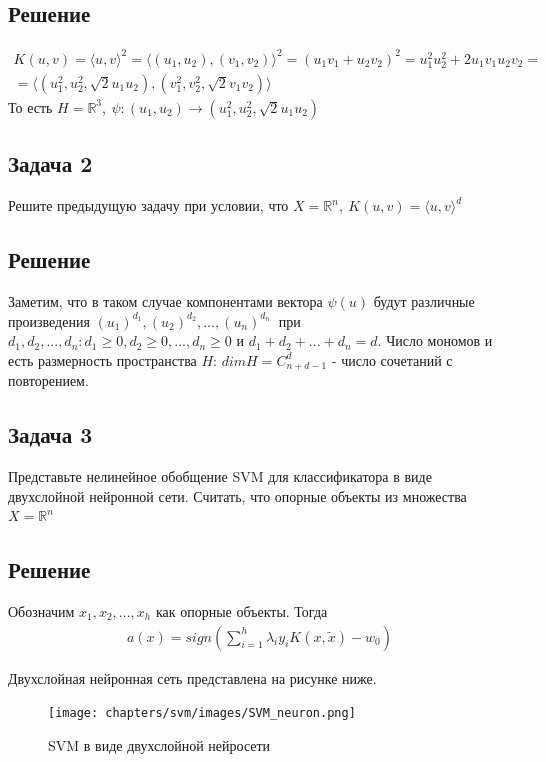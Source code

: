 \subsection{Решение}
\begin{align*}
  K(u, v) = \langle u, v \rangle^2 = \langle (u_1, u_2), (v_1, v_2) \rangle^2 = (u_1v_1 + u_2v_2)^2 = u_1^2 u_2^2 + 2u_1v_1u_2v_2 = \\
  = \langle(u_1^2, u_2^2, \sqrt{2}u_1u_2),(v_1^2, v_2^2, \sqrt{2}v_1v_2)\rangle 
\end{align*}
То есть $ H = \mathbb{R}^3, ~ \psi: (u_1, u_2) \rightarrow (u_1^2, u_2^2, \sqrt{2}u_1u_2)$

\subsection{Задача 2}
Решите предыдущую задачу при условии, что $X = \mathbb{R}^n, ~ K(u, v) = \langle u, v \rangle^{d}$
\subsection{Решение}
Заметим, что в таком случае компонентами вектора $\psi(u)$ будут различные произведения $(u_1)^{d_1}, (u_2)^{d_2}, ..., (u_n)^{d_n}~$ при
$d_1, d_2, ..., d_n: d_1 \ge 0, d_2 \ge 0, ..., d_n \ge 0$ и $ d_1 + d_2 + ... + d_n = d$. Число мономов и есть размерность пространства $H$: $dim H = C_{n + d - 1} ^ d$ - число сочетаний с повторением.

\subsection{Задача 3}
Представьте нелинейное обобщение SVM для классификатора в виде двухслойной нейронной сети. Считать,
что опорные объекты из множества $ X = \mathbb{R}^n~$
\subsection{Решение}
Обозначим $x_1, x_2, ..., x_h$ как опорные объекты. Тогда
\begin{align}
  a(x) = sign(\sum_{i = 1}^{h} \lambda_i y_i K(x, \tilde{x}) - w_0)
\end{align}

\noindent Двухслойная нейронная сеть представлена на рисунке ниже.

\begin{figure}[h!]
  \centering
  \texttt{[image: chapters/svm/images/SVM\_neuron.png]}
  \caption{SVM в виде двухслойной нейросети}
  \label{fig:mpr}
\end{figure}

